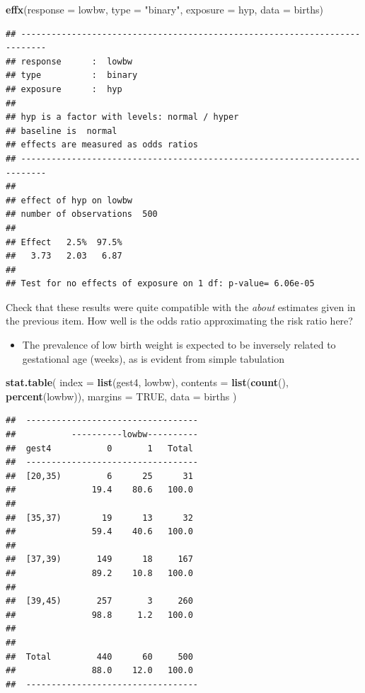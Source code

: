\documentclass[
]{book}
\newenvironment{Shaded}{\begin{snugshade}}{\end{snugshade}}
\newcommand{\AttributeTok}[1]{\textcolor[rgb]{0.13,0.29,0.53}{#1}}
\newcommand{\ConstantTok}[1]{\textcolor[rgb]{0.56,0.35,0.01}{#1}}
\newcommand{\FunctionTok}[1]{\textcolor[rgb]{0.13,0.29,0.53}{\textbf{#1}}}
\newcommand{\NormalTok}[1]{#1}
\newcommand{\StringTok}[1]{\textcolor[rgb]{0.31,0.60,0.02}{#1}}
\providecommand{\tightlist}{%
  \setlength{\itemsep}{0pt}\setlength{\parskip}{0pt}}
\begin{document}
\begin{Shaded}
\begin{Highlighting}[]
\FunctionTok{effx}\NormalTok{(}\AttributeTok{response =}\NormalTok{ lowbw, }\AttributeTok{type =} \StringTok{"binary"}\NormalTok{, }\AttributeTok{exposure =}\NormalTok{ hyp, }\AttributeTok{data =}\NormalTok{ births)}
\end{Highlighting}
\end{Shaded}

\begin{verbatim}
## --------------------------------------------------------------------------- 
## response      :  lowbw 
## type          :  binary 
## exposure      :  hyp 
## 
## hyp is a factor with levels: normal / hyper 
## baseline is  normal 
## effects are measured as odds ratios 
## --------------------------------------------------------------------------- 
## 
## effect of hyp on lowbw 
## number of observations  500 
## 
## Effect   2.5%  97.5% 
##   3.73   2.03   6.87 
## 
## Test for no effects of exposure on 1 df: p-value= 6.06e-05
\end{verbatim}

Check that these results were quite compatible with the
\emph{about} estimates given in the previous item.
How well is the odds ratio approximating the risk ratio here?

\begin{itemize}
\tightlist
\item
  The prevalence of low birth weight is expected to be inversely related
  to gestational age (weeks), as is evident from simple tabulation
\end{itemize}

\begin{Shaded}
\begin{Highlighting}[]
\FunctionTok{stat.table}\NormalTok{(}
  \AttributeTok{index =} \FunctionTok{list}\NormalTok{(gest4, lowbw),}
  \AttributeTok{contents =} \FunctionTok{list}\NormalTok{(}\FunctionTok{count}\NormalTok{(), }\FunctionTok{percent}\NormalTok{(lowbw)),}
  \AttributeTok{margins =} \ConstantTok{TRUE}\NormalTok{, }\AttributeTok{data =}\NormalTok{ births}
\NormalTok{)}
\end{Highlighting}
\end{Shaded}

\begin{verbatim}
##  ---------------------------------- 
##           ----------lowbw---------- 
##  gest4           0       1   Total  
##  ---------------------------------- 
##  [20,35)         6      25      31  
##               19.4    80.6   100.0  
##                                     
##  [35,37)        19      13      32  
##               59.4    40.6   100.0  
##                                     
##  [37,39)       149      18     167  
##               89.2    10.8   100.0  
##                                     
##  [39,45)       257       3     260  
##               98.8     1.2   100.0  
##                                     
##                                     
##  Total         440      60     500  
##               88.0    12.0   100.0  
##  ----------------------------------
\end{verbatim}
\end{document}
